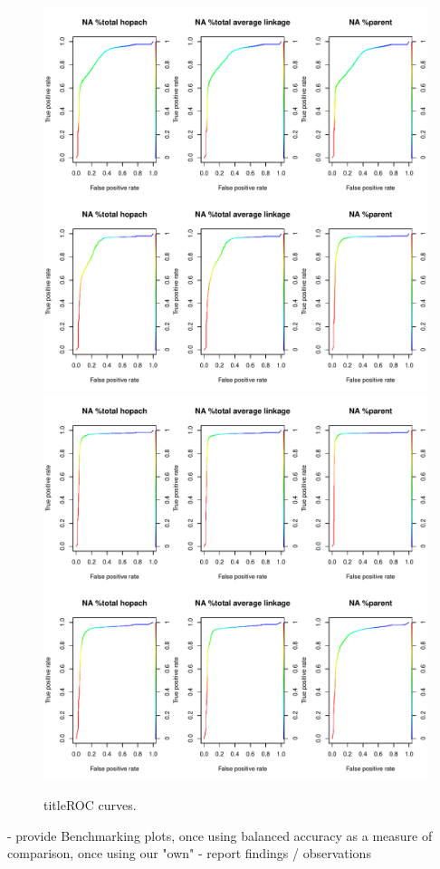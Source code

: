 \begin{figure}[H]
\begin{knitrout}
\includegraphics[width=\maxwidth]{figure/ch04_figunnamed-chunk-1-5} 

\includegraphics[width=\maxwidth]{figure/ch04_figunnamed-chunk-1-6} 
\end{knitrout}
title{ROC curves.\label{fig:1}}
\end{figure}


- provide Benchmarking plots, once using balanced accuracy as a measure of comparison, once using our "own"
- report findings / observations
